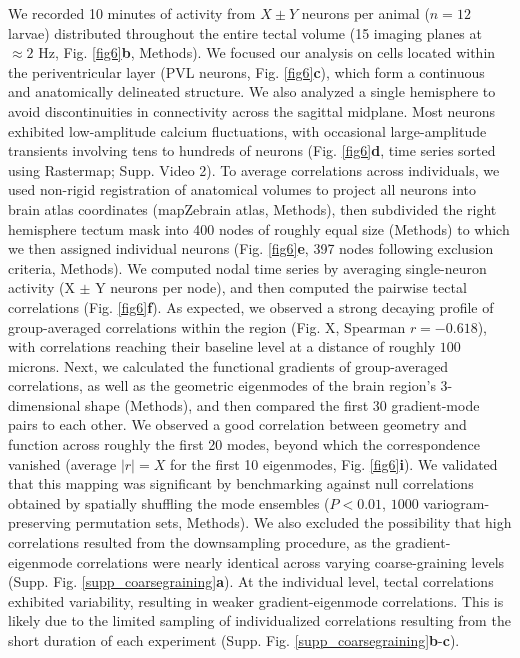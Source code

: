 \documentclass{article}
\begin{document}
We recorded 10 minutes of activity from $X\pm Y$ neurons per animal ($n=12$ larvae) distributed throughout the entire tectal volume (15 imaging planes at $\approx2$ Hz, Fig. \ref{fig6}\textbf{b}, Methods). We focused our analysis on cells located within the periventricular layer (PVL neurons, Fig. \ref{fig6}\textbf{c}), which form a continuous and anatomically delineated structure. We also analyzed a single hemisphere to avoid discontinuities in connectivity across the sagittal midplane. Most neurons exhibited low-amplitude calcium fluctuations, with occasional large-amplitude transients involving tens to hundreds of neurons (Fig. \ref{fig6}\textbf{d}, time series sorted using Rastermap; Supp. Video 2). To average correlations across individuals, we used non-rigid registration of anatomical volumes to project all neurons into brain atlas coordinates (mapZebrain atlas, Methods), then subdivided the right hemisphere tectum mask into 400 nodes of roughly equal size (Methods) to which we then assigned individual neurons (Fig. \ref{fig6}\textbf{e}, 397 nodes following exclusion criteria, Methods). We computed nodal time series by averaging single-neuron activity (X $\pm$ Y neurons per node), and then computed the pairwise tectal correlations (Fig. \ref{fig6}\textbf{f}). As expected, we observed a strong decaying profile of group-averaged correlations within the region (Fig. X, Spearman $r=-0.618$), with correlations reaching their baseline level at a distance of roughly $100$ microns. Next, we calculated the functional gradients of group-averaged correlations, as well as the geometric eigenmodes of the brain region's 3-dimensional shape (Methods), and then compared the first 30 gradient-mode pairs to each other. We observed a good correlation between geometry and function across roughly the first 20 modes, beyond which the correspondence vanished (average $|r|=X$ for the first 10 eigenmodes, Fig. \ref{fig6}\textbf{i}). We validated that this mapping was significant by benchmarking against null correlations obtained by spatially shuffling the mode ensembles ($P<0.01$, $1000$ variogram-preserving permutation sets, Methods). We also excluded the possibility that high correlations resulted from the downsampling procedure, as the gradient-eigenmode correlations were nearly identical across varying coarse-graining levels (Supp. Fig. \ref{supp_coarsegraining}\textbf{a}). At the individual level, tectal correlations exhibited variability, resulting in weaker gradient-eigenmode correlations. This is likely due to the limited sampling of individualized correlations resulting from the short duration of each experiment (Supp. Fig. \ref{supp_coarsegraining}\textbf{b}-\textbf{c}).
\end{document}
